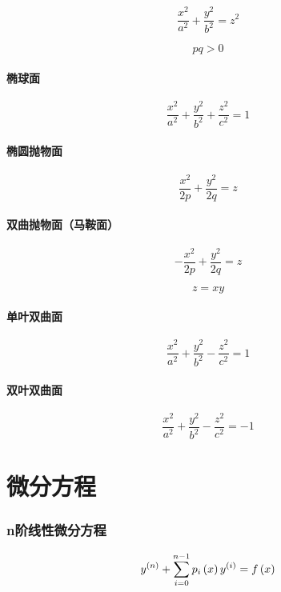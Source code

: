 \documentclass{article}
\begin{document}
\[\frac{x^2}{a^2}+\frac{y^2}{b^2}=z^2\]

\begin{definition}[以下二次曲面方程中都有]
    \[pq>0\]
\end{definition}

\subsection{椭球面}

\[\frac{x^2}{a^2}+\frac{y^2}{b^2}+\frac{z^2}{c^2}=1\]

\subsection{椭圆抛物面}

\[\frac{x^2}{2p}+\frac{y^2}{2q}=z\]

\subsection{双曲抛物面（马鞍面）}

\[-\frac{x^2}{2p}+\frac{y^2}{2q}=z\]

\[z=xy\]

\subsection{单叶双曲面}

\[\frac{x^2}{a^2}+\frac{y^2}{b^2}-\frac{z^2}{c^2}=1\]

\subsection{双叶双曲面}

\[\frac{x^2}{a^2}+\frac{y^2}{b^2}-\frac{z^2}{c^2}=-1\]

\part{微分方程}

\section{n阶线性微分方程}

\begin{definition}[]
    \[y^{\left(n\right)}+\sum_{i=0}^{n-1}p_i\left(x\right)y^{\left(i\right)}=f\left(x\right)\label{LinearDifferentialEquationsOfOrderN}\]
\end{definition}
\end{document}
